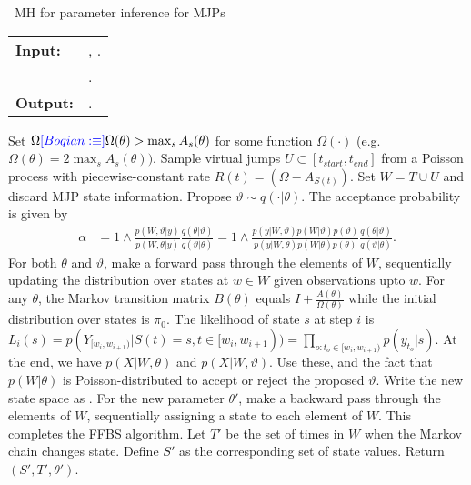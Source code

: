 \begin{algorithm}[H]
   \caption{\Naive\  MH for parameter inference for MJPs }
   \label{alg:MH_naive}
  \begin{tabular}{l l}
   \textbf{Input:  } & \text{Observations $X$}, 
                       \text{the previous MJP path $S(t) = (S, T)$ and parameters $\theta$}.\\ 
                     & \text{A  Metropolis-Hasting proposal $q(\cdot | \theta)$}.\\
   \textbf{Output:  }& \text{A new MJP trajectory $S'(t) = (S', T')$, 
                            new MJP parameters $\theta'$}.\\
   \hline
   \end{tabular}
   \begin{algorithmic}[1]
     \State Set $\Omega \textcolor{blue}{[Boqian: \equiv]} \Omega(\theta) > \max_s{A_s(\theta)}$ for
     some function $\Omega(\cdot)$ (e.g.\ $\Omega(\theta) = 
      2\max_s A_s(\theta))$.
      \State Sample virtual jumps $U\subset[t_{start}, t_{end}]$ from a 
      Poisson process with piecewise-constant rate 
      $R(t) = (\Omega - A_{S(t)})$. 
    Set $W = T \cup U$ and discard MJP state information.
      \State Propose $\vartheta \sim q(\cdot| \theta)$.
          The acceptance probability is given by 
          \begin{align*}
          \alpha &=  1 \wedge \frac{p(W,\vartheta| y)}{p(W, \theta| y)} \frac{q(\theta|\vartheta)}{q(\vartheta|\theta)}
          =  1 \wedge \frac{p(y| W,\vartheta) p(W | \vartheta)p(\vartheta)}{p(y|W, \theta)p(W | \theta)p(\theta)} \frac{q(\theta|\vartheta)}{q(\vartheta|\theta)}.
          \end{align*}
    \State For both $\theta$ and $\vartheta$, make a forward pass through the 
    elements of $W$, sequentially updating the distribution over states at 
    $w \in W$ given observations upto $w$. 
    For any $\theta$, the Markov transition matrix 
    $B(\theta)$ equals $I + \frac{A(\theta)}{\Omega(\theta)}$ while the initial distribution
      over states is $\pi_0$. The likelihood of state $s$ at step $i$ is 
      $ L_i(s) = p(Y_{[w_i, w_{i + 1})} | S(t) = s , t \in [w_i, w_{i + 1})) = 
      \prod_{o: t_o \in [w_i, w_{i + 1})}p(y_{t_o} | s)$.
    At the end, we have 
    $p(X|W,\theta)$ and $p(X|W,\vartheta)$. Use these, and the fact that 
    $p(W|\theta)$ is Poisson-distributed to accept or reject the
    proposed $\vartheta$. Write the new state space
    as .
    \State For the new parameter $\theta'$, make a backward pass through 
    the elements of
    $W$, sequentially assigning a state to each element of $W$. This
    completes the FFBS algorithm.
    \State Let $T'$ be the set of times in $W$ when the Markov chain changes state. Define $S'$ as the corresponding set of state values. Return $(S', T', \theta')$.
\end{algorithmic}
\end{algorithm}
